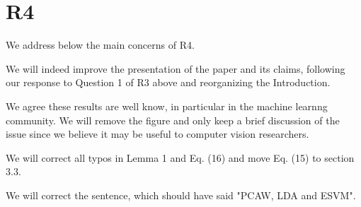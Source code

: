 \documentclass[10pt,twocolumn,letterpaper]{article}
\begin{document}
\section{R4} We address below the main concerns of R4.

 We will indeed improve the presentation of the paper
and its claims, following our response to Question 1 of R3 above and reorganizing the Introduction.

 We agree these results are well know, in particular in the machine learnng community. We will remove the figure and
only keep a brief discussion of the issue since we believe it may be useful to
computer vision researchers.

 We will correct all typos in Lemma 1 and Eq. (16) and move Eq. (15) to section 3.3.

 We will correct the sentence, which should have said "PCAW, LDA and ESVM".





\end{document}
